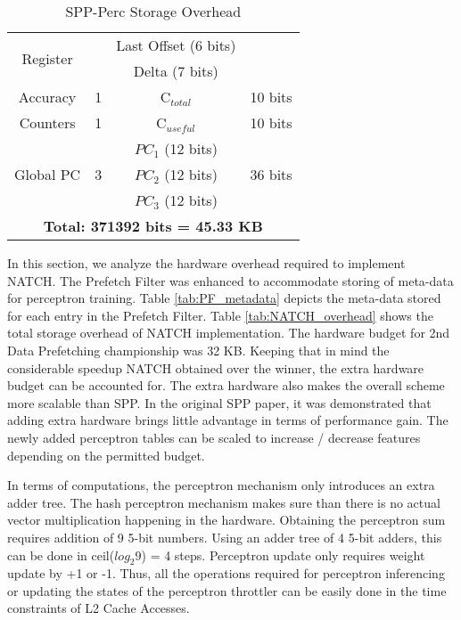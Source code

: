 \begin{table}[]
\begin{tabular}{|c|c|c|c|}
        \multirow{2}{1.2cm}{Register}               &                        & Last Offset (6 bits) &                               \\
                                                    &                        & Delta (7 bits)       &                               \\
    \hline
        Accuracy        & 1     & C$_{total}$       & 10 bits   \\
        Counters        & 1     & C$_{useful}$      & 10 bits   \\
    \hline
        \multirow{3}{1.5cm}{Global PC\newline}      &       & $PC_1$ (12 bits)      &           \\
        \multirow{2}{1.5cm}{~Trackers}              & 3     & $PC_2$ (12 bits)      & 36 bits   \\
                                                    &       & $PC_3$ (12 bits)      &           \\
    \hline
        \multicolumn{4}{|c|}{\textbf{Total: 371392 bits = 45.33 KB}}\\
    \hline
    \end{tabular}
    \caption{SPP-Perc Storage Overhead}
    \label{tab:SPPPerc_overhead}
\end{table}


In this section, we analyze the hardware overhead required to
implement NATCH.  The Prefetch Filter was enhanced to accommodate
storing of meta-data for perceptron training.  Table
\ref{tab:PF_metadata} depicts the meta-data stored for each entry in
the Prefetch Filter.  Table \ref{tab:NATCH_overhead} shows the total
storage overhead of NATCH implementation.  The hardware budget for
2nd Data Prefetching championship was 32 KB.  Keeping that in mind 
the considerable speedup NATCH obtained over the winner, the extra hardware
budget can be accounted for.  The extra hardware also makes the
overall scheme more scalable than SPP.  In the original SPP paper, it
was demonstrated that adding extra hardware brings little advantage in
terms of performance gain.  The newly added perceptron tables can be
scaled to increase / decrease features depending on the permitted
budget.

In terms of computations, the perceptron mechanism only introduces an
extra adder tree.  The hash perceptron mechanism makes sure than there
is no actual vector multiplication happening in the hardware.
Obtaining the perceptron sum requires addition of 9 5-bit numbers.
Using an adder tree of 4 5-bit adders, this can be done in
ceil($log_{2}9$) = 4 steps.  Perceptron update only requires weight
update by +1 or -1.  Thus, all the operations required for perceptron
inferencing or updating the states of the perceptron throttler can be
easily done in the time constraints of L2 Cache Accesses.

